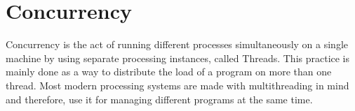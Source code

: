 \documentclass[12pt,a4paper,teal]{bbe}
\begin{document}
	
	\chapter{Concurrency}
	Concurrency is the act of running different processes simultaneously 
	on a single machine by using separate processing instances, called Threads. 
	This practice is mainly done as a way to distribute the load 
	of a program on more than one thread. Most modern processing systems are made with
	multithreading in mind and therefore, use it for managing different programs at
	the same time.
	
\end{document}
